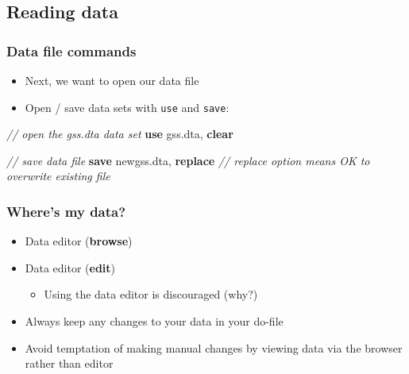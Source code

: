 \documentclass[
]{book}
\newenvironment{Shaded}{\begin{snugshade}}{\end{snugshade}}
\newcommand{\CommentTok}[1]{\textcolor[rgb]{0.56,0.35,0.01}{\textit{#1}}}
\newcommand{\KeywordTok}[1]{\textcolor[rgb]{0.13,0.29,0.53}{\textbf{#1}}}
\newcommand{\NormalTok}[1]{#1}
\providecommand{\tightlist}{%
  \setlength{\itemsep}{0pt}\setlength{\parskip}{0pt}}
\begin{document}
\hypertarget{reading-data-2}{%
\subsection{Reading data}\label{reading-data-2}}

\hypertarget{data-file-commands}{%
\subsubsection{Data file commands}\label{data-file-commands}}

\begin{itemize}
\tightlist
\item
  Next, we want to open our data file
\item
  Open / save data sets with \texttt{use} and \texttt{save}:
\end{itemize}

\begin{Shaded}
\begin{Highlighting}[]
\CommentTok{// open the gss.dta data set }
\KeywordTok{use}\NormalTok{ gss.dta, }\KeywordTok{clear}

\CommentTok{// save data file}
\KeywordTok{save}\NormalTok{ newgss.dta, }\KeywordTok{replace} \CommentTok{// \textasciigrave{}replace\textasciigrave{} option means OK to overwrite existing file}
\end{Highlighting}
\end{Shaded}

\hypertarget{wheres-my-data}{%
\subsubsection{Where's my data?}\label{wheres-my-data}}

\begin{itemize}
\tightlist
\item
  Data editor (\textbf{browse})
\item
  Data editor (\textbf{edit})

  \begin{itemize}
  \tightlist
  \item
    Using the data editor is discouraged (why?)
  \end{itemize}
\item
  Always keep any changes to your data in your do-file
\item
  Avoid temptation of making manual changes by viewing data via the browser rather than editor
\end{itemize}
\end{document}
